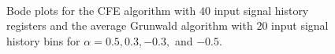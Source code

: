 \begin{figure}[ht!]
\begin{center}
\\
\end{center}
\label{fig:bode20}
\caption{Bode plots for the CFE algorithm with $40$ input signal history registers
  and the average Grunwald algorithm with $20$ input signal history
  bins for $\alpha=0.5, 0.3, -0.3,$ and $-0.5$. }

\end{figure}
